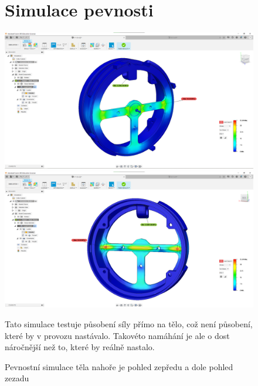 \begin{figure}
\section{Simulace pevnosti}
    \centering
    \includegraphics[width=370pt]{kapitoly/obrazky/E4/machanika_tlakove_desky/simulace/F100N,primo,uprostred,pohled_zepredu.png}
    \includegraphics[width=370pt]{kapitoly/obrazky/E4/machanika_tlakove_desky/simulace/F100N,primo,uprostred,pohled_zezadu.png}
    \caption{Pevnostní simulace těla nahoře je pohled zepředu a dole pohled zezadu \centering}
    Tato simulace testuje působení síly přímo na tělo, což není působení, které by v provozu nastávalo. Takovéto namáhání je ale o dost náročnější
    než to, které by reálně nastalo.
    \label{fig:E4-simulace_tela} %
\end{figure}

